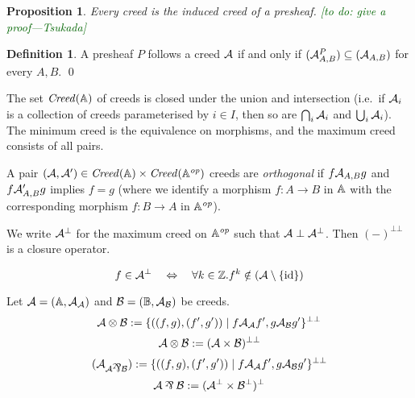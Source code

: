\documentclass[conference]{IEEEtran}
\theoremstyle{plain}
\newtheorem{proposition}[theorem]{Proposition}
\theoremstyle{definition}
\newtheorem{definition}[theorem]{Definition}
\theoremstyle{remark}
\newcommand{\tk}[1]{{\textcolor{DarkGreen}{[{#1}---Tsukada]}}}
\newcommand{\tk}[1]{}
\begin{document}
\begin{proposition}
    Every creed is the induced creed of a presheaf.
    \tk{to do: give a proof}
\end{proposition}

\begin{definition}
    A presheaf \( P \) follows a creed \( \mathcal{A} \) if and only if \( ({\mathcal{A}^P_{A,B}}) \subseteq ({\mathcal{A}_{A,B}}) \) for every \( A,B \).
    \qed
\end{definition}

The set \( \mathit{Creed}(\mathbb{A}) \) of creeds is closed under the union and intersection (i.e.~if \( \mathcal{A}_i \) is a collection of creeds parameterised by \( i \in I \), then so are \( \bigcap_i \mathcal{A}_i \) and \( \bigcup_i \mathcal{A}_i \)).
The minimum creed is the equivalence on morphisms, and the maximum creed consists of all pairs.

A pair \( (\mathcal{A}, \mathcal{A}') \in \mathit{Creed}(\mathbb{A}) \times \mathit{Creed}(\mathbb{A}^{\mathit{op}}) \) creeds are \emph{orthogonal} if \( f \mathcal{A}_{A,B} g \) and \( f \mathcal{A}'_{A,B} g \) implies \( f = g \) (where we identify a morphism \( f \colon A \longrightarrow B \) in \( \mathbb{A} \) with the corresponding morphism \( f \colon B \longrightarrow A \) in \( \mathbb{A}^{\mathit{op}} \)).

\newcommand{\orthogonal}{\mathrel{\bot}}
We write \( \mathcal{A}^\bot \) for the maximum creed on \( \mathbb{A}^{\mathit{op}} \) such that \( \creed \orthogonal \creed^\bot \).
Then \( ({-})^{\bot\bot} \) is a closure operator.

\newcommand{\Int}{\mathbb{Z}}

\begin{equation*}
    f \in \creed^\bot
    \quad\Leftrightarrow\quad
    \forall k \in \Int. f^k \notin (\creed \setminus \{ \ident \})
\end{equation*}

Let \( \mathcal{A} = (\mathbb{A}, \mathcal{A}_{\mathcal{A}}) \) and \( \mathcal{B} = (\mathbb{B}, \mathcal{A}_{\mathcal{B}}) \) be creeds.
\begin{equation*}
    \mathcal{A} \otimes \mathcal{B} := \{ ((f, g), (f', g')) \mid f \mathcal{A}_{\mathcal{A}} f', g \mathcal{A}_{\mathcal{B}} g' \}^{\bot\bot}
\end{equation*}
\begin{equation*}
    \mathcal{A} \otimes \mathcal{B} := (\mathcal{A} \times \mathcal{B})^{\bot\bot}
\end{equation*}
\begin{equation*}
    ({\creed_{\kit \llpar \kitb}}) := \{ ((f, g), (f', g')) \mid f \creed_\kit f', g \creed_\kitb g' \}^{\bot\bot}
\end{equation*}
\begin{equation*}
    \creed \llpar \creedb := (\creed^\bot \times \creedb^\bot)^\bot
\end{equation*}
\end{document}
